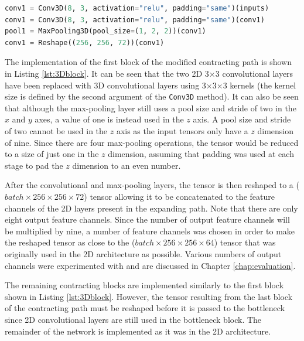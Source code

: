 \begin{lstlisting}[float={!t},caption={The implementation of the first contracting block of the modified U-Net architecture using the Keras functional API.},label={lst:3Dblock},language=Python,upquote=true,belowskip=0pt]
conv1 = Conv3D(8, 3, activation="relu", padding="same")(inputs)
conv1 = Conv3D(8, 3, activation="relu", padding="same")(conv1)
pool1 = MaxPooling3D(pool_size=(1, 2, 2))(conv1)
conv1 = Reshape((256, 256, 72))(conv1)
\end{lstlisting}
The implementation of the first block of the modified contracting path is shown in Listing \ref{lst:3Dblock}. It can be seen that the two 2D 3$\times$3 convolutional layers have been replaced with 3D convolutional layers using 3$\times$3$\times$3 kernels (the kernel size is defined by the second argument of the \texttt{Conv3D} method). It can also be seen that although the max-pooling layer still uses a pool size and stride of two in the $x$ and $y$ axes, a value of one is instead used in the $z$ axis. A pool size and stride of two cannot be used in the $z$ axis as the input tensors only have a $z$ dimension of nine. Since there are four max-pooling operations, the tensor would be reduced to a size of just one in the $z$ dimension, assuming that padding was used at each stage to pad the $z$ dimension to an even number.

After the convolutional and max-pooling layers, the tensor is then reshaped to a ($batch \times 256 \times 256 \times 72$) tensor allowing it to be concatenated to the feature channels of the 2D layers present in the expanding path. Note that there are only eight output feature channels. Since the number of output feature channels will be multiplied by nine, a number of feature channels was chosen in order to make the reshaped tensor as close to the ($batch \times 256 \times 256 \times 64$) tensor that was originally used in the 2D architecture as possible. Various numbers of output channels were experimented with and are discussed in Chapter \ref{chap:evaluation}.

The remaining contracting blocks are implemented similarly to the first block shown in Listing \ref{lst:3Dblock}. However, the tensor resulting from the last block of the contracting path must be reshaped before it is passed to the bottleneck since 2D convolutional layers are still used in the bottleneck block. The remainder of the network is implemented as it was in the 2D architecture.

